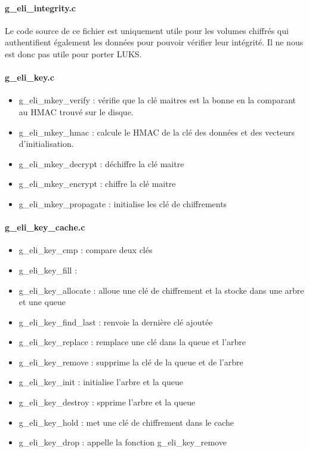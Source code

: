 \paragraph{g\_eli\_integrity.c}
Le code source de ce fichier est uniquement utile pour les volumes chiffrés qui
authentifient également les données pour pouvoir vérifier leur intégrité.
Il ne nous est donc pas utile pour porter LUKS.
\paragraph{g\_eli\_key.c}
\begin{itemize}
	\item g\_eli\_mkey\_verify : vérifie que la clé maitres est la bonne en
		la comparant au HMAC trouvé sur le disque.
	\item g\_eli\_mkey\_hmac : calcule le HMAC de la clé des données et des
		vecteurs d'initialisation.
	\item g\_eli\_mkey\_decrypt : déchiffre la clé maitre
	\item g\_eli\_mkey\_encrypt : chiffre la clé maitre
	\item g\_eli\_mkey\_propagate : initialise les clé de chiffrements
\end{itemize}
\paragraph{g\_eli\_key\_cache.c}
\begin{itemize}
	\item g\_eli\_key\_cmp : compare deux clés
	\item g\_eli\_key\_fill : 
	\item g\_eli\_key\_allocate : alloue une clé de chiffrement et la 
		stocke dans une arbre et une queue
	\item g\_eli\_key\_find\_last : renvoie la dernière clé ajoutée
	\item g\_eli\_key\_replace : remplace une clé dans la queue et l'arbre
	\item g\_eli\_key\_remove : supprime la clé de la queue et de l'arbre
	\item g\_eli\_key\_init : initialise l'arbre et la queue
	\item g\_eli\_key\_destroy : spprime l'arbre et la queue
	\item g\_eli\_key\_hold : met une clé de chiffrement dans le cache
	\item g\_eli\_key\_drop : appelle la fonction g\_eli\_key\_remove
\end{itemize}

